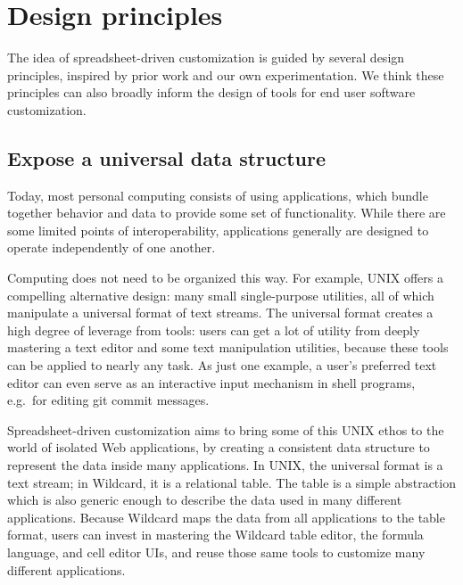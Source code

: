 \documentclass[english,submission]{programming}
\begin{document}
\hypertarget{sec:design-principles}{%
\section{Design principles}\label{sec:design-principles}}

The idea of spreadsheet-driven customization is guided by several design
principles, inspired by prior work and our own experimentation. We think
these principles can also broadly inform the design of tools for end
user software customization.

\hypertarget{expose-a-universal-data-structure}{%
\subsection{Expose a universal data
structure}\label{expose-a-universal-data-structure}}

Today, most personal computing consists of using applications, which
bundle together behavior and data to provide some set of functionality.
While there are some limited points of interoperability, applications
generally are designed to operate independently of one another.

Computing does not need to be organized this way. For example, UNIX
offers a compelling alternative design: many small single-purpose
utilities, all of which manipulate a universal format of text streams.
The universal format creates a high degree of leverage from tools: users
can get a lot of utility from deeply mastering a text editor and some
text manipulation utilities, because these tools can be applied to
nearly any task. As just one example, a user's preferred text editor can
even serve as an interactive input mechanism in shell programs, e.g.~for
editing git commit messages.

Spreadsheet-driven customization aims to bring some of this UNIX ethos
to the world of isolated Web applications, by creating a consistent data
structure to represent the data inside many applications. In UNIX, the
universal format is a text stream; in Wildcard, it is a relational
table. The table is a simple abstraction which is also generic enough to
describe the data used in many different applications. Because Wildcard
maps the data from all applications to the table format, users can
invest in mastering the Wildcard table editor, the formula language, and
cell editor UIs, and reuse those same tools to customize many different
applications.
\end{document}
